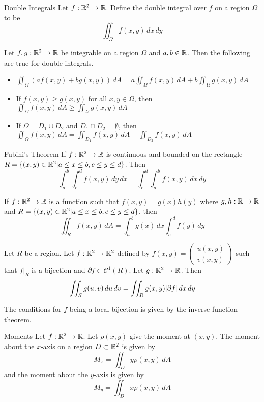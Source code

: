 \documentclass[a4paper]{article}
\begin{document}
\begin{defn}{Double Integrals}{} Let $f:\mathbb{R}^2\to\mathbb{R}$. Define the double integral over $f$ on a region $\Omega$ to be $$\iint_\Omega f(x,y)\,dx\,dy$$
\end{defn}

\begin{prp}{}{} Let $f,g:\mathbb{R}^2\to\mathbb{R}$ be integrable on a region $\Omega$ and $a,b\in\mathbb{R}$. Then the following are true for double integrals. 
\begin{itemize}
\item $\iint_\Omega(af(x,y)+bg(x,y))\,dA=a\iint_\Omega f(x,y)\,dA+b\iint_\Omega g(x,y)\,dA$
\item If $f(x,y)\geq g(x,y)$ for all $x,y\in\Omega$, then $\iint_\Omega f(x,y)\,dA\geq\iint_\Omega g(x,y)\,dA$
\item If $\Omega=D_1\cup D_2$ and $D_1\cap D_2=\emptyset$, then $\iint_\Omega f(x,y)\,dA=\iint_{D_1}f(x,y)\,dA+\iint_{D_2}f(x,y)\,dA$
\end{itemize}
\end{prp}

\begin{prp}{Fubini's Theorem}{} If $f:\mathbb{R}^2\to\mathbb{R}$ is continuous and bounded on the rectangle $R=\{(x,y)\in\mathbb{R}^2|a\leq x\leq b, c\leq y\leq d\}$. Then $$\int_a^b\int_c^df(x,y)\,dy\,dx=\int_c^d\int_a^bf(x,y)\,dx\,dy$$
\end{prp}

\begin{prp}{}{} If $f:\mathbb{R}^2\to\mathbb{R}$ is a function such that $f(x,y)=g(x)h(y)$ where $g,h:\mathbb{R}\to\mathbb{R}$ and $R=\{(x,y)\in\mathbb{R}^2|a\leq x\leq b, c\leq y\leq d\}$, then $$\iint_Rf(x,y)\,dA=\int_a^bg(x)\,dx\int_c^df(y)\,dy$$
\end{prp}

\begin{thm}{}{} Let $R$ be a region. Let $f:\mathbb{R}^2\to\mathbb{R}^2$ defined by $f(x,y)=\begin{pmatrix}u(x,y)\\v(x,y)\end{pmatrix}$ such that $f|_R$ is a bijection and $\partial f\in\mathcal{C}^1(R)$. Let $g:\mathbb{R}^2\to\mathbb{R}$. Then $$\iint_Sg(u,v)\,du\,dv=\iint_Rg(x,y)\abs{\partial f}\,dx\,dy$$
\end{thm}

The conditions for $f$ being a local bijection is given by the inverse function theorem. 

\begin{thm}{Moments}{} Let $f:\mathbb{R}^2\to\mathbb{R}$. Let $\rho(x,y)$ give the moment at $(x,y)$. The moment about the $x$-axis on a region $D\subset\mathbb{R}^2$ is given by $$M_x=\iint_Dy\rho(x,y)\,dA$$ and the moment about the $y$-axis is given by $$M_y=\iint_Dx\rho(x,y)\,dA$$
\end{thm}
\end{document}
